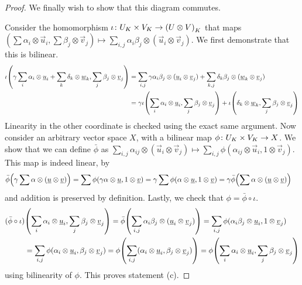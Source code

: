 \begin{proof}
    We finally wish to show that this diagram commutes.
    \begin{center}
    \end{center}
    Consider the homomorphism \(\func{\iota}{U_K \times V_K}{\pqty{U \otimes V}_K}\)
    that maps \((\sum \alpha_i\otimes\vec{u}_i, \sum \beta_j\otimes\vec{v}_j)
    \mapsto \sum_{i,j} \alpha_i\beta_j\otimes(\vec{u}_i\otimes\vec{v}_j)\).
    We first demonstrate that this is bilinear.
    \begin{align*}
        \iota\pqty{\gamma\sum_i\alpha_i\otimes\vec{u}_i+\sum_k\delta_k\otimes\vec{w}_k, \sum_j\beta_j\otimes\vec{v}_j}
        &= \sum_{i,j} \gamma\alpha_i\beta_j\otimes(\vec{u}_i\otimes\vec{v}_j)
        + \sum_{k,j} \delta_k\beta_j\otimes(\vec{w}_k\otimes\vec{v}_j) \\
        &= \gamma\iota\pqty{\sum_i\alpha_i\otimes\vec{u}_i,\sum_j\beta_j\otimes\vec{v}_j}
        + \iota\pqty{\delta_k\otimes\vec{w}_k,\sum_j\beta_j\otimes\vec{v}_j}
    \end{align*}
    Linearity in the other coordinate is checked using the exact same argument.
    Now consider an arbitrary vector space \(X\),
    with a bilinear map \(\phi\colon U_K \times V_K\to X\).
    We show that we can define \(\bar{\phi}\) as
    \(\sum_{i,j}\alpha_{ij}\otimes(\vec{u}_i\otimes\vec{v}_j)
    \mapsto \sum_{i,j} \phi(\alpha_{ij}\otimes\vec{u}_i,1\otimes\vec{v}_j)\).
    This map is indeed linear, by
    \begin{align*}
        \bar{\phi}\pqty{\gamma \sum \alpha\otimes(\vec{u}\otimes\vec{v})}
        &= \sum \phi(\gamma\alpha\otimes\vec{u},1\otimes\vec{v})
        = \gamma \sum \phi(\alpha\otimes\vec{u},1\otimes\vec{v})
        = \gamma \bar{\phi}\pqty{\sum \alpha\otimes(\vec{u}\otimes\vec{v})}
    \end{align*}
    and addition is preserved by definition.
    Lastly, we check that \(\phi = \bar{\phi}\circ\iota\).
    \begin{align*}
        (\bar{\phi}\circ\iota)&\pqty{\sum_i\alpha_i\otimes\vec{u}_i,\sum_j\beta_j\otimes\vec{v}_j}
        = \bar{\phi}\pqty{\sum_{i,j} \alpha_i\beta_j\otimes(\vec{u}_i\otimes\vec{v}_j)}
        = \sum_{i,j} \phi(\alpha_i\beta_j\otimes\vec{u}_i,1\otimes\vec{v}_j) \\
        &= \sum_{i,j} \phi(\alpha_i\otimes\vec{u}_i,\beta_j\otimes\vec{v}_j)
        = \phi\pqty{\sum_{i,j} (\alpha_i\otimes\vec{u}_i,\beta_j\otimes\vec{v}_j)}
        = \phi\pqty{\sum_i\alpha_i\otimes\vec{u}_i,\sum_j\beta_j\otimes\vec{v}_j}
    \end{align*}
    using bilinearity of \(\phi\).
    This proves statement (c).
\end{proof}


